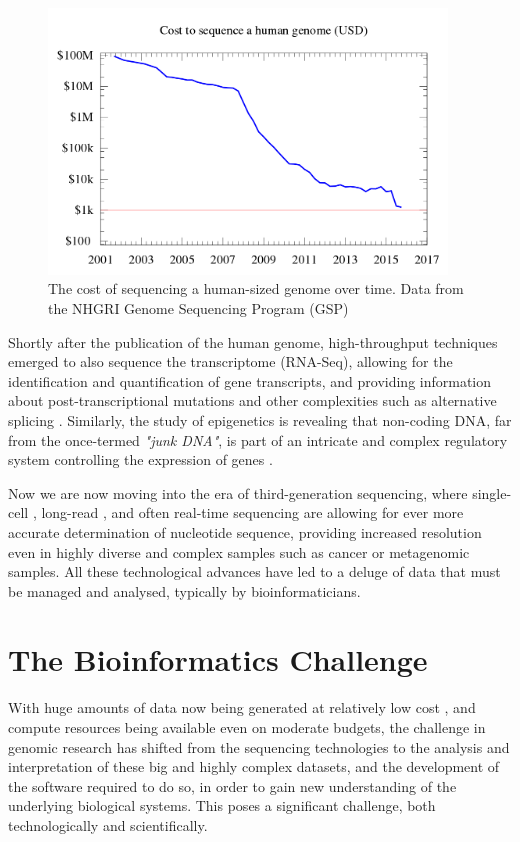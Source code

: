 \begin{figure}[h!]
    \centering
    \includegraphics[width=300pt]{chapters/images/Historic_cost_of_sequencing_a_human_genome.png}
    \caption{The cost of sequencing a human-sized genome over time. Data from the NHGRI Genome Sequencing Program (GSP) }
    \label{fig:seqcost}
\end{figure}

Shortly after the publication of the human genome, high-throughput techniques emerged to also sequence the transcriptome (RNA-Seq), allowing for the identification and quantification of gene transcripts, and providing information about post-transcriptional mutations and other complexities such as alternative splicing \cite{wang2009rna}. Similarly, the study of epigenetics is revealing that non-coding DNA, far from the once-termed \textit{"junk DNA"}, is part of an intricate and complex regulatory system controlling the expression of genes \cite{zuckerkandl2007combinatorial}.

Now we are now moving into the era of third-generation sequencing, where single-cell \cite{gawad2016single}, long-read \cite{koren2015one}, and often real-time sequencing \cite{flusberg2010direct} are allowing for ever more accurate determination of nucleotide sequence, providing increased resolution even in highly diverse and complex samples such as cancer or metagenomic samples. All these technological advances have led to a deluge of data that must be managed and analysed, typically by bioinformaticians.


\section{The Bioinformatics Challenge}

With huge amounts of data now being generated at relatively low cost \cite{chen2014big}, and compute resources being available even on moderate budgets, the challenge in genomic research has shifted from the sequencing technologies to the analysis and interpretation of these big and highly complex datasets, and the development of the software required to do so, in order to gain new understanding of the underlying biological systems. This poses a significant challenge, both technologically and scientifically.

